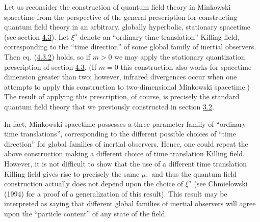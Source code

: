 \documentclass[11pt,a4paper]{article}
\begin{document}
Let us reconsider the construction of quantum field theory in Minkowski spacetime from the perspective of the general prescription for constructing quantum field theory in an arbitrary, globally hyperbolic, stationary spacetime (see section \hyperlink{sec:4.3}{4.3}). Let \(\xi^a\) denote an ``ordinary time translation'' Killing field, corresponding to the ``time direction'' of some global family of inertial observers. Then eq. (\hyperref[eq:4.3.2]{4.3.2}) holds, so if \(m>0\) we may apply the stationary quantization prescription of section \hyperlink{sec:4.3}{4.3}. (If \(m=0\) this construction also works for spacetime dimension greater than two; however, infrared divergences occur when one attempts to apply this construction to two-dimensional Minkowski spacetime.) The result of applying this prescription, of course, is precisely the standard quantum field theory that we previously constructed in section \hyperlink{sec:3.2}{3.2}.

In fact, Minkowski spacetime possesses a three-parameter family of ``ordinary time translations'', corresponding to the different possible choices of ``time direction'' for global families of inertial observers. Hence, one could repeat the above construction making a different choice of time translation Killing field. However, it is not difficult to show that the use of a different time translation Killing field gives rise to precisely the same \(\mu,\) and thus the quantum field construction actually does not depend upon the choice of \(\xi^a\) (see Chmielowski (1994) for a proof of a generalization of this result). This result may be interpreted as saying that different global families of inertial observers will agree upon the ``particle content'' of any state of the field.
\end{document}
